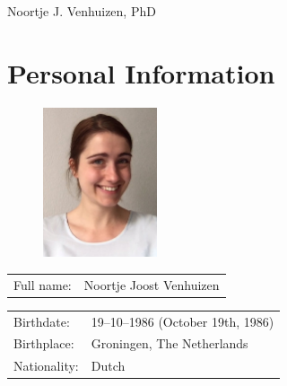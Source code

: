 \documentclass[a4paper,10pt]{article}
\def\leftcolwidth{.12\textwidth}
\def\tablevspace{10pt}
\begin{document}

\begin{flushright}
{\Huge Noortje J. Venhuizen, PhD}
\end{flushright}


\section*{Personal Information}

\begin{figure}
  \begin{flushright}
  \includegraphics[width=0.3\textwidth]{noortje.jpg}
  \end{flushright}
\end{figure}

\noindent
\begin{tabularx}{\textwidth}{ p{\leftcolwidth} X }
  Full name:      &         Noortje Joost Venhuizen\\
\end{tabularx}

\vspace{\tablevspace}

\noindent
\begin{tabularx}{\textwidth}{ p{\leftcolwidth} X }
  Birthdate:   &         19--10--1986 (October 19th, 1986)\\
  Birthplace:  &         Groningen, The Netherlands\\
  Nationality: &         Dutch\\
\end{tabularx}
\end{document}
